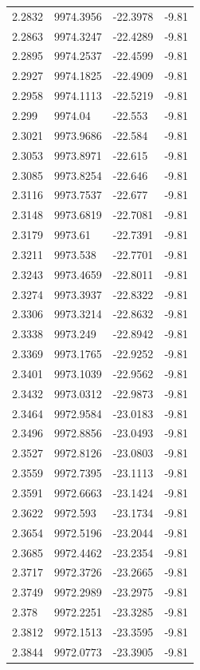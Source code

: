 \begin{table}[H]
\begin{tabular}{llll}
2.2832 & 9974.3956 & -22.3978 & -9.81 \\
2.2863 & 9974.3247 & -22.4289 & -9.81 \\
2.2895 & 9974.2537 & -22.4599 & -9.81 \\
2.2927 & 9974.1825 & -22.4909 & -9.81 \\
2.2958 & 9974.1113 & -22.5219 & -9.81 \\
2.299 & 9974.04 & -22.553 & -9.81 \\
2.3021 & 9973.9686 & -22.584 & -9.81 \\
2.3053 & 9973.8971 & -22.615 & -9.81 \\
2.3085 & 9973.8254 & -22.646 & -9.81 \\
2.3116 & 9973.7537 & -22.677 & -9.81 \\
2.3148 & 9973.6819 & -22.7081 & -9.81 \\
2.3179 & 9973.61 & -22.7391 & -9.81 \\
2.3211 & 9973.538 & -22.7701 & -9.81 \\
2.3243 & 9973.4659 & -22.8011 & -9.81 \\
2.3274 & 9973.3937 & -22.8322 & -9.81 \\
2.3306 & 9973.3214 & -22.8632 & -9.81 \\
2.3338 & 9973.249 & -22.8942 & -9.81 \\
2.3369 & 9973.1765 & -22.9252 & -9.81 \\
2.3401 & 9973.1039 & -22.9562 & -9.81 \\
2.3432 & 9973.0312 & -22.9873 & -9.81 \\
2.3464 & 9972.9584 & -23.0183 & -9.81 \\
2.3496 & 9972.8856 & -23.0493 & -9.81 \\
2.3527 & 9972.8126 & -23.0803 & -9.81 \\
2.3559 & 9972.7395 & -23.1113 & -9.81 \\
2.3591 & 9972.6663 & -23.1424 & -9.81 \\
2.3622 & 9972.593 & -23.1734 & -9.81 \\
2.3654 & 9972.5196 & -23.2044 & -9.81 \\
2.3685 & 9972.4462 & -23.2354 & -9.81 \\
2.3717 & 9972.3726 & -23.2665 & -9.81 \\
2.3749 & 9972.2989 & -23.2975 & -9.81 \\
2.378 & 9972.2251 & -23.3285 & -9.81 \\
2.3812 & 9972.1513 & -23.3595 & -9.81 \\
2.3844 & 9972.0773 & -23.3905 & -9.81 \\

\end{tabular}
\end{table}
